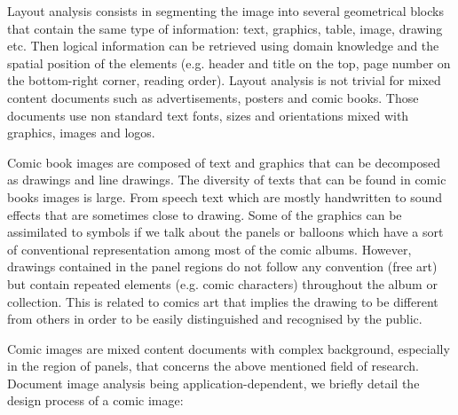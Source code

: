 Layout analysis consists in segmenting the image into several geometrical blocks that contain the same type of information: text, graphics, table, image, drawing etc.
Then logical information can be retrieved using domain knowledge and the spatial position of the elements (e.g. header and title on the top, page number on the bottom-right corner, reading order).
Layout analysis is not trivial for mixed content documents such as advertisements, posters and comic books.
Those documents use non standard text fonts, sizes and orientations mixed with graphics, images and logos.%


Comic book images are composed of text and graphics that can be decomposed as drawings and line drawings.
The diversity of texts that can be found in comic books images is large.
From speech text which are mostly handwritten to sound effects that are sometimes close to drawing.
Some of the graphics can be assimilated to symbols if we talk about the panels or balloons which have a sort of conventional representation among most of the comic albums.
However, drawings contained in the panel regions do not follow any convention (free art) but contain repeated elements (e.g. comic characters) throughout the album or collection.
This is related to comics art that implies the drawing to be different from others in order to be easily distinguished and recognised by the public.

Comic images are mixed content documents with complex background, especially in the region of panels, that concerns the above mentioned field of research.
Document image analysis being application-dependent, we briefly detail the design process of a comic image:


